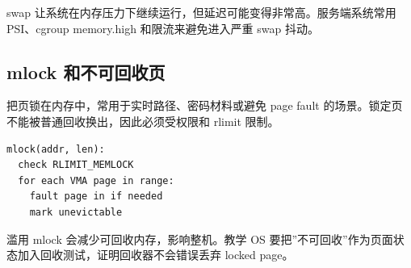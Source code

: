 swap 让系统在内存压力下继续运行，但延迟可能变得非常高。服务端系统常用 PSI、cgroup memory.high 和限流来避免进入严重 swap 抖动。

\subsection{mlock 和不可回收页}

 把页锁在内存中，常用于实时路径、密码材料或避免 page fault 的场景。锁定页不能被普通回收换出，因此必须受权限和 rlimit 限制。

\begin{lstlisting}
mlock(addr, len):
  check RLIMIT_MEMLOCK
  for each VMA page in range:
    fault page in if needed
    mark unevictable
\end{lstlisting}

滥用 mlock 会减少可回收内存，影响整机。教学 OS 要把”不可回收”作为页面状态加入回收测试，证明回收器不会错误丢弃 locked page。

